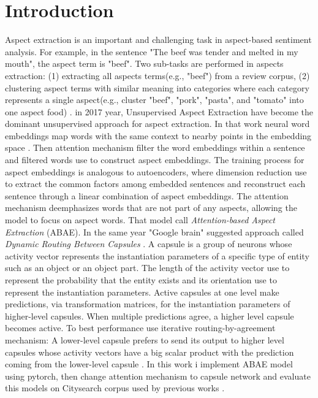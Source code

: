 \documentclass{article}
\begin{document}
\section{Introduction}
Aspect extraction is an important and challenging task in aspect-based sentiment analysis. For example, in the sentence "The beef was tender and melted in my mouth", the aspect term is "beef". Two sub-tasks are performed in aspects extraction: (1) extracting all aspects terms(e.g., "beef") from a review corpus, (2) clustering aspect terms with similar meaning into categories where each category represents a single aspect(e.g., cluster "beef", "pork", "pasta", and "tomato" into one aspect food) \cite{He2018ABAE}. in 2017 year, Unsupervised Aspect Extraction \cite{He2018ABAE} have become the dominant unsupervised approach for aspect extraction. In that work neural word embeddings map words with the same context to nearby points in the embedding space \cite{Mikolov2013W2V}. Then attention mechanism \cite{Bahdanau2015NMT} filter the word embeddings within a sentence and filtered words use to construct aspect embeddings. The training process for aspect embeddings is analogous to autoencoders, where dimension reduction use to extract the common factors among embedded sentences and reconstruct each sentence through a linear combination of aspect embeddings. The attention mechanism deemphasizes words that are not part of any aspects, allowing the model to focus on aspect words. That model call \textit{Attention-based Aspect Extraction} (ABAE). In the same year "Google brain" suggested approach called \textit{Dynamic Routing Between Capsules} \cite{Hinton2017DRBC}. A capsule is a group of neurons whose activity vector represents the instantiation parameters of a specific type of entity such as an object or an object part. The length of the activity vector use to represent the probability that the entity exists and its orientation use to represent the instantiation parameters. Active capsules at one level make predictions, via transformation matrices, for the instantiation parameters of higher-level capsules. When multiple predictions agree, a higher level capsule becomes active. To best performance use iterative routing-by-agreement mechanism: A lower-level capsule prefers to send its output to higher level capsules whose activity vectors have a big scalar product with the prediction coming from the lower-level capsule \cite{Hinton2017DRBC}. In this work i implement ABAE model using pytorch, then change attention mechanism to capsule network and evaluate this models on Citysearch corpus used by previous works \cite{Ganu2009BeyondTheStars} \cite{Brody2010UAS} \cite{Zhao2010JMA} \cite{He2018ABAE}.
\end{document}
